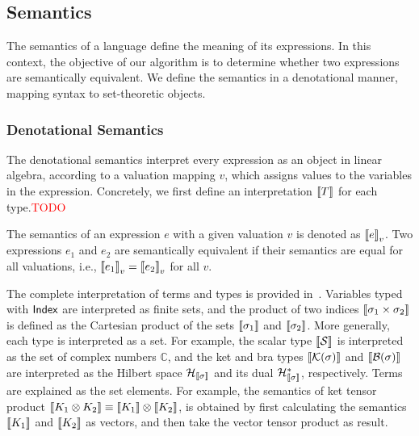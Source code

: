 






\subsection{Semantics}

The semantics of a language define the meaning of its expressions. In this context, the objective of our algorithm is to determine whether two expressions are semantically equivalent. We define the semantics in a denotational manner, mapping syntax to set-theoretic objects.

\subsubsection{Denotational Semantics}
The denotational semantics interpret every expression as an object in
linear algebra, according to a valuation mapping \( v \), which
assigns values to the variables in the expression. Concretely, we
first define an interpretation ${\llbracket T \rrbracket}$ for each type.{\textcolor{red}{TODO}}


The semantics of an expression \( e \) with a given valuation \( v \)
is denoted as \( {\llbracket e \rrbracket}_v \). Two expressions \( e_1 \) and \( e_2 \)
are semantically equivalent if their semantics are equal for all
valuations, i.e., \( {\llbracket e_1 \rrbracket}_v = {\llbracket e_2 \rrbracket}_v \) for all \( v \).

The complete interpretation of terms and types is provided in~. Variables typed with \( \mathsf{Index} \) are interpreted as finite sets, and the product of two indices \( {\llbracket \sigma_1 \times \sigma_2 \rrbracket} \) is defined as the Cartesian product of the sets \( {\llbracket \sigma_1 \rrbracket} \) and \( {\llbracket \sigma_2 \rrbracket} \). More generally, each type is interpreted as a set. For example, the scalar type \( {\llbracket \mathcal{S} \rrbracket} \) is interpreted as the set of complex numbers \( \mathbb{C} \), and the ket and bra types \( {\llbracket \mathcal{K}(\sigma) \rrbracket} \) and \( {\llbracket \mathcal{B}(\sigma) \rrbracket} \) are interpreted as the Hilbert space \( \mathcal{H}_{{\llbracket \sigma \rrbracket}} \) and its dual \( \mathcal{H}_{{\llbracket \sigma \rrbracket}}^* \), respectively. Terms are explained as the set elements. For example, the semantics of ket tensor product ${\llbracket K_1 \otimes K_2 \rrbracket} \equiv {\llbracket K_1 \rrbracket} \otimes {\llbracket K_2 \rrbracket}$, is obtained by first calculating the semantics ${\llbracket K_1 \rrbracket}$ and ${\llbracket K_2 \rrbracket}$ as vectors, and then take the vector tensor product as result.

